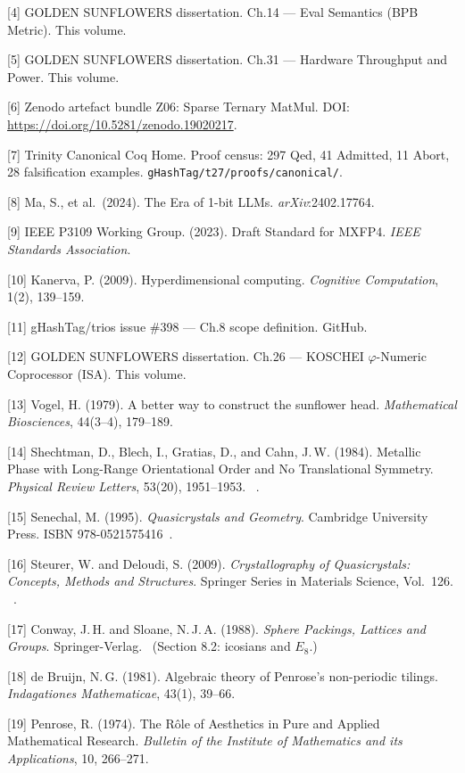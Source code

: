 [4] GOLDEN SUNFLOWERS dissertation. Ch.14 ---
Eval Semantics (BPB Metric). This volume.

[5] GOLDEN SUNFLOWERS dissertation. Ch.31 ---
Hardware Throughput and Power. This volume.

[6] Zenodo artefact bundle Z06: Sparse Ternary
MatMul. DOI:
\url{https://doi.org/10.5281/zenodo.19020217}.

[7] Trinity Canonical Coq Home. Proof census:
297 Qed, 41 Admitted, 11 Abort, 28 falsification
examples. \texttt{gHashTag/t27/proofs/canonical/}.

[8] Ma, S., et al.~(2024). The Era of 1-bit
LLMs. \emph{arXiv}:2402.17764.

[9] IEEE P3109 Working Group. (2023). Draft
Standard for MXFP4. \emph{IEEE Standards
Association}.

[10] Kanerva, P. (2009). Hyperdimensional
computing. \emph{Cognitive Computation}, 1(2),
139--159.

[11] gHashTag/trios issue \#398 --- Ch.8 scope
definition. GitHub.

[12] GOLDEN SUNFLOWERS dissertation. Ch.26 ---
KOSCHEI \(\varphi\)-Numeric Coprocessor (ISA). This volume.

[13] Vogel, H. (1979). A better way to
construct the sunflower head. \emph{Mathematical
Biosciences}, 44(3--4), 179--189.

[14] Shechtman, D., Blech, I., Gratias, D., and
Cahn, J.\,W. (1984). Metallic Phase with
Long-Range Orientational Order and No
Translational Symmetry. \emph{Physical Review
Letters}, 53(20), 1951--1953.
~\cite{shechtman1984}.

[15] Senechal, M. (1995). \emph{Quasicrystals and
Geometry}. Cambridge University Press.
ISBN 978-0521575416~\cite{senechal_quasicrystals}.

[16] Steurer, W. and Deloudi, S. (2009).
\emph{Crystallography of Quasicrystals: Concepts,
Methods and Structures}. Springer Series in
Materials Science, Vol.~126.
~\cite{steurer2009quasicrystals}.

[17] Conway, J.\,H. and Sloane, N.\,J.\,A. (1988).
\emph{Sphere Packings, Lattices and Groups}.
Springer-Verlag.~\cite{conway1988sphere}
(Section 8.2: icosians and \(E_8\).)

[18] de Bruijn, N.\,G. (1981). Algebraic theory
of Penrose's non-periodic tilings. \emph{Indagationes
Mathematicae}, 43(1), 39--66.~\cite{debruijn1981}

[19] Penrose, R. (1974). The R{\^o}le of Aesthetics
in Pure and Applied Mathematical Research.
\emph{Bulletin of the Institute of Mathematics
and its Applications}, 10, 266--271.~\cite{penrose1974}

